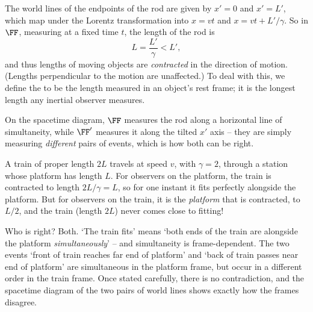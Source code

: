 The world lines of the endpoints of the rod are given by $x' = 0$ and $x' = L'$, which map under the Lorentz transformation into $x = vt$ and $x = vt + L'/\gamma$.
So in $\FF$, measuring at a fixed time $t$, the length of the rod is
$$
L = \frac{L'}{\gamma} < L',
$$
and thus lengths of moving objects are \emph{contracted} in the direction of motion. (Lengths perpendicular to the motion are unaffected.) To deal with this, we define the  to be the length measured in an object's rest frame; it is the longest length any inertial observer measures.

\begin{center}
\end{center}

On the spacetime diagram, $\FF$ measures the rod along a horizontal line of simultaneity, while $\FF'$ measures it along the tilted $x'$ axis -- they are simply measuring \emph{different} pairs of events, which is how both can be right.

\begin{example}
	A train of proper length $2L$ travels at speed $v$, with $\gamma = 2$, through a station whose platform has length $L$. For observers on the platform, the train is contracted to length $2L/\gamma = L$, so for one instant it fits perfectly alongside the platform. But for observers on the train, it is the \emph{platform} that is contracted, to $L/2$, and the train (length $2L$) never comes close to fitting!

	Who is right? Both. `The train fits' means `both ends of the train are alongside the platform \emph{simultaneously}' -- and simultaneity is frame-dependent. The two events `front of train reaches far end of platform' and `back of train passes near end of platform' are simultaneous in the platform frame, but occur in a different order in the train frame. Once stated carefully, there is no contradiction, and the spacetime diagram of the two pairs of world lines shows exactly how the frames disagree.
\end{example}

